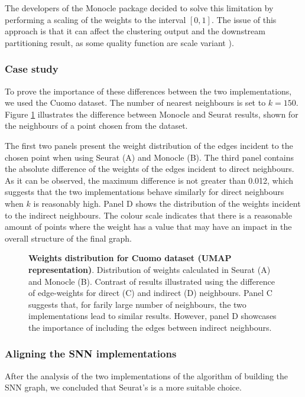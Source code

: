 The developers of the Monocle package decided to solve this limitation by performing a scaling of the weights to the interval $[0, 1]$. The issue of this approach is that it can affect the clustering output and the downstream partitioning result, as some quality function are scale variant \cite{Laarhoven2014}).

\subsubsection{Case study}
To prove the importance of these differences between the two implementations, we used the Cuomo \cite{Cuomo2020} dataset. The number of nearest neighbours is set to $k = 150$. Figure \ref{fig:s4-m3-snn-3} illustrates the difference between Monocle and Seurat results, shown for the neighbours of a point chosen from the dataset.

The first two panels present the weight distribution of the edges incident to the chosen point when using Seurat (A) and Monocle (B). The third panel contains the absolute difference of the weights of the edges incident to direct neighbours. As it can be observed, the maximum difference is not greater than 0.012, which suggests that the two implementations behave similarly for direct neighbours when $k$ is reasonably high. Panel D shows the distribution of the weights incident to the indirect neighbours. The colour scale indicates that there is a reasonable amount of points where the weight has a value that may have an impact in the overall structure of the final graph.
\begin{figure}[H]
    \centering
    \caption{\label{fig:s4-m3-snn-3}\textbf{Weights distribution for Cuomo dataset (UMAP representation)}. Distribution of weights calculated in Seurat (A) and Monocle (B). Contrast of results illustrated using the difference of edge-weights for direct (C) and indirect (D) neighbours. Panel C suggests that, for farily large number of neighbours, the two implementations lead to similar results. However, panel D showcases the importance of including the edges between indirect neighbours.
}
\end{figure}

\subsubsection{Aligning the SNN implementations}
After the analysis of the two implementations of the algorithm of building the SNN graph, we concluded that Seurat's is a more suitable choice.


